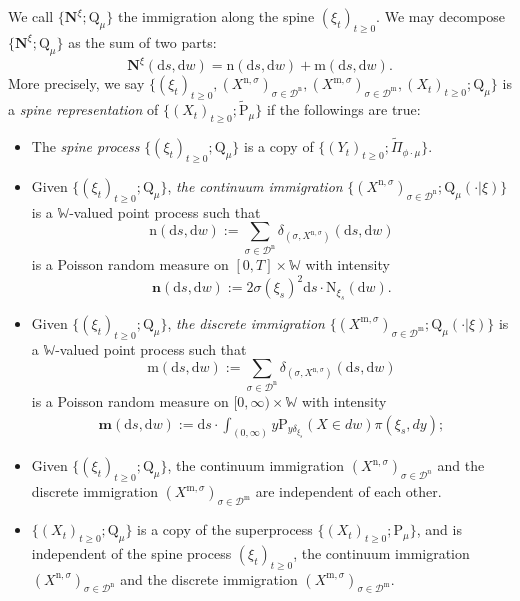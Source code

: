 \documentclass[12pt,a4paper]{amsart}
\numberwithin{equation}{section}
\theoremstyle{plain}
\theoremstyle{definition}
\theoremstyle{remark}
\begin{document}
{        We call $\{\mathbf N^\xi; \mathrm Q_\mu\}$ the immigration along the spine $(\xi_t)_{t\geq 0}$. We may decompose $\{\mathbf N^\xi; \mathrm Q_\mu\}$ as the sum of two parts:
    $$
    \mathbf N^\xi(\mathrm ds, \mathrm dw)=\mathrm n(\mathrm ds, \mathrm dw)+\mathrm m(\mathrm ds, \mathrm dw).
    $$
More precisely,
        we say $\{(\xi_t)_{t\geq 0}, (X^{\mathrm n, \sigma})_{\sigma\in \mathcal D^\mathrm n}, (X^{\mathrm m, \sigma})_{\sigma \in \mathcal D^\mathrm m}, (X_t)_{t\geq 0}; \mathrm Q_{\mu}\}$ is a \emph{spine representation} of $\{(X_t)_{t\geq 0}; \widetilde {\mathrm P}_\mu\}$ if the followings are true:
\begin{itemize}
\item
    The \emph{spine process} $\{(\xi_t)_{t\geq 0}; \mathrm Q_\mu\}$ is a copy of $\{(Y_t)_{t\geq 0}; \widetilde \Pi_{\phi\cdot\mu}\}$.
\item
	Given $\{(\xi_t)_{t\geq 0}; \mathrm Q_\mu\}$, \emph{the continuum immigration} $\{ (X^{\mathrm n,\sigma})_{\sigma \in \mathcal D^\mathrm n}; \mathrm Q_\mu(\cdot |\xi)\}$ is a $\mathbb W$-valued point process such that
\[
	\mathrm n(\mathrm ds, \mathrm dw) := \sum_{\sigma\in \mathcal D^{\mathrm n}} \delta_{(\sigma, X^{\mathrm n,\sigma})}(\mathrm ds, \mathrm dw)
\]
 is a Poisson random measure on $[0,T]\times \mathbb W$ with intensity
\[
\mathbf n(\mathrm ds, \mathrm dw):= 2 \sigma(\xi_s)^2 \mathrm ds \cdot \mathrm N_{\xi_s}(\mathrm dw).
\]
\item
	Given $\{(\xi_t)_{t\geq 0}; \mathrm Q_\mu\}$, \emph{the discrete immigration} $\{(X^{\mathrm m,\sigma})_{\sigma\in \mathcal D^{\mathrm m}}; \mathrm Q_\mu(\cdot |\xi)\}$ is a $\mathbb W$-valued point process such that
\[
	\mathrm m(\mathrm ds, \mathrm dw) := \sum_{\sigma\in \mathcal D^{\mathrm n}} \delta_{(\sigma, X^{\mathrm n,\sigma})}(\mathrm ds, \mathrm dw)
\]
	is a Poisson random measure on $[0,\infty ) \times \mathbb W$ with intensity
\begin{align}
 \mathbf m(\mathrm ds, \mathrm dw):= \mathrm ds \cdot \int_{(0,\infty)} y \mathrm P_{y\delta_{\xi_s}}(X\in dw) \pi(\xi_s,dy);
\end{align}
\item
	Given $\{(\xi_t)_{t\geq 0}; \mathrm Q_\mu\}$, the continuum immigration $(X^{\mathrm n,\sigma})_{\sigma \in \mathcal D^n}$ and the discrete immigration $(X^{\mathrm m,\sigma})_{\sigma\in \mathcal D^{\mathrm m}}$ are independent of each other.
\item
	$\{(X_t)_{t\geq 0}; \mathrm Q_\mu\}$ is a copy of the superprocess $\{(X_t)_{t\geq 0}; \mathrm P_\mu\}$, and is independent of the spine process $(\xi_t)_{t\geq 0}$, the continuum immigration $(X^{\mathrm n,\sigma})_{\sigma \in \mathcal D^\mathrm n}$ and the discrete immigration $(X^{\mathrm m,\sigma})_{\sigma\in \mathcal D^{\mathrm m}}$.
\end{itemize}


}
\end{document}
